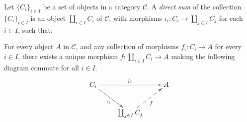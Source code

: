 \documentclass[12pt]{article}
\begin{document}
Let $\{C_i\}_{i \in I}$ be a set of objects in a category $\mathcal{C}$. A {\em direct sum} of the collection $\{C_i\}_{i \in I}$ is an object $\coprod_{i \in I} C_i$ of $\mathcal{C}$, with morphisms $\iota_i: C_i \longrightarrow \coprod_{j \in I} C_j$ for each $i \in I$, such that:

For every object $A$ in $\mathcal{C}$, and any collection of morphisms $f_i: C_i \longrightarrow A$ for every $i \in I$, there exists a unique morphism $f: \coprod_{i \in I} C_i \longrightarrow A$ making the following diagram commute for all $i \in I$.
$$
\xymatrix{
C_i \ar[dr]_{\iota_i} \ar[rr]^{f_i} & & A \\
& \coprod_{j \in I} C_j \ar@{-->}[ur]_{f}
}
$$
\end{document}
